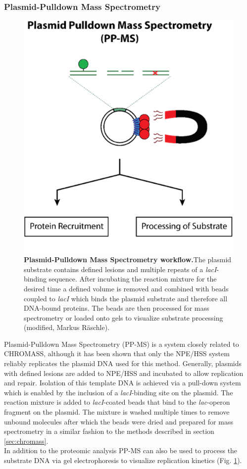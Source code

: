 \subsubsection{Plasmid-Pulldown Mass Spectrometry}
\label{sec:pp-ms}
\begin{figure}
    \includegraphics[width=.48\textwidth]{resources/images/Intro/pp-ms.png}
    \caption[Plasmid-Pulldown Mass Spectrometry workflow]{\textbf{Plasmid-Pulldown Mass Spectrometry workflow.}The plasmid substrate contains defined lesions and multiple repeats of a \textit{lacI}-binding sequence. After incubating the reaction mixture for the desired time a defined volume is removed and combined with beads coupled to \textit{lacI} which binds the plasmid substrate and therefore all DNA-bound proteins. The beads are then processed for mass spectrometry or loaded onto gels to visualize substrate processing (modified, Markus Räschle).}
    \label{fig:pp-ms}
\end{figure}
Plasmid-Pulldown Mass Spectrometry (PP-MS) is a system closely related to CHROMASS, although it has been shown that only the NPE/HSS system reliably replicates the plasmid DNA used for this method. Generally, plasmids with defined lesions are added to NPE/HSS and incubated to allow replication and repair. Isolation of this template DNA is achieved via a pull-down system which is enabled by the inclusion of a \textit{lacI}-binding site on the plasmid. The reaction mixture is added to \textit{lacI}-coated beads that bind to the \textit{lac}-operon fragment on the plasmid. The mixture is washed multiple times to remove unbound molecules after which the beads were dried and prepared for mass spectrometry in a similar fashion to the methods described in section \ref{sec:chromass}.\\
In addition to the proteomic analysis PP-MS can also be used to process the substrate DNA via gel electrophoresis to visualize replication kinetics (Fig. \ref{fig:pp-ms}).\\ 
